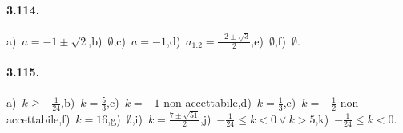 \paragraph{3.114.} a)~$ a =-1 \pm \sqrt{2} $,\quad b)~$ \emptyset $,\quad c)~$ a =-1 $,\quad d)~$ a_{1.2} =\frac{- 2 \pm \sqrt{3}}{2} $,\quad e)~$ \emptyset $,\quad f)~$ \emptyset $.

\paragraph{3.115.} a)~$ k \geq-\frac{1}{24} $,\quad b)~$ k = \frac{5}{3} $,\quad c)~$ k=-1 $ non accettabile,\quad d)~$ k = \frac{1}{3} $,\quad e)~$ k =-\frac{1}{2}$ non accettabile,\quad f)~$ k = 16 $,\quad g)~$ \emptyset $,\quad i)~$ k = \frac{7 \pm \sqrt{51}}{2} $,\quad j)~$ - \frac{1}{24} \leq k < 0 \vee k > 5 $,\quad k)~$ - \frac{1}{24} \leq k < 0 $.

